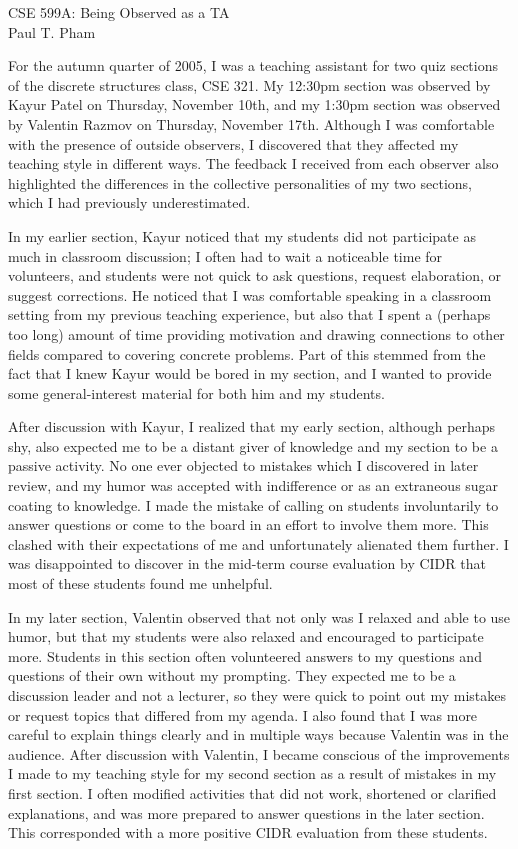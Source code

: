 \documentclass{article}
\begin{document}
\begin{center}
\Large{CSE 599A: Being Observed as a TA}\\
\vspace{0.4\baselineskip}
\large{Paul T. Pham}
\end{center}

For the autumn quarter of 2005, I was a teaching assistant for two quiz
sections of the discrete structures class, CSE 321. My 12:30pm section
was observed by Kayur Patel on Thursday, November 10th, and my 1:30pm
section was observed by Valentin Razmov on Thursday, November 17th.
Although I was comfortable with the presence of outside observers,
I discovered that they affected my teaching style in different ways. The
feedback I received from each observer also highlighted the differences
in the collective personalities of my two sections, which I had
previously underestimated.

In my earlier section, Kayur noticed that my students did not participate
as much in classroom discussion; I often had to wait a noticeable time
for volunteers, and students were not quick to ask questions, request
elaboration, or suggest corrections. He noticed that I was comfortable
speaking in a classroom setting from my previous teaching experience,
but also that I spent a (perhaps too long) amount of time providing
motivation and drawing connections to other fields compared to covering
concrete problems. Part of this stemmed from the fact that I knew
Kayur would be bored in my section, and I wanted to provide some
general-interest material for both him and my students.

After discussion with Kayur, I realized that my
early section, although perhaps shy, also expected me to be a distant
giver of knowledge and my section to be a passive activity. No one ever
objected to mistakes which I discovered in later review, and my humor
was accepted with indifference or as an extraneous sugar coating to
knowledge. I made the mistake
of calling on students involuntarily to answer questions or come to the board
in an effort to involve them more. This clashed with their expectations of me
and unfortunately alienated them further. I was disappointed to discover
in the mid-term course evaluation by CIDR that most of these students
found me unhelpful.

In my later section, Valentin observed that not only was I relaxed and
able to use humor, but that my students were also relaxed and encouraged
to participate more. Students in this section often volunteered answers
to my questions and questions of their own without my prompting. They
expected me to be a discussion leader and not a lecturer, so they were
quick to point out my mistakes or request topics that differed from my
agenda. I also found that I was more careful to explain things clearly and
in multiple ways because Valentin was in the audience. After discussion with
Valentin, I became conscious of the improvements I made to my teaching
style for my second section as a result of mistakes in my first section.
I often modified activities that did not work, shortened or clarified
explanations, and was more prepared to answer questions in the later
section. This corresponded with a more positive CIDR evaluation from
these students.
\end{document}
